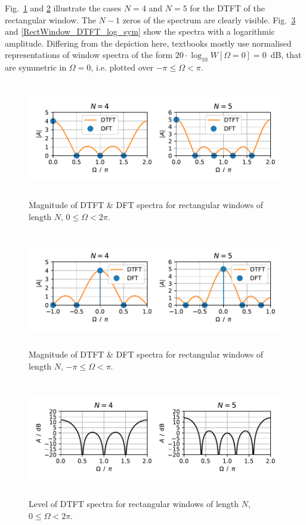 \documentclass[11pt,a4paper,DIV=12]{scrartcl}
\begin{document}
Fig.~\ref{RectWindow_DTFT_DFT_lin_asym} and \ref{RectWindow_DTFT_DFT_lin_sym}
illustrate the cases $N=4$ and $N=5$ for the DTFT of the rectangular window.
%
The $N-1$ zeros of the spectrum are clearly visible.
%
Fig.~\ref{RectWindow_DTFT_log_asym} and \ref{RectWindow_DTFT_log_sym} show the
spectra with a logarithmic amplitude.
%
Differing from the depiction here, textbooks mostly use normalised representations
of window spectra of the form $20\cdot\log_{10}W[\Omega=0]=0$~dB, that are
symmetric in $\Omega=0$, i.e. plotted over $-\pi\leq\Omega<\pi$.
%
\begin{figure}
		\centering
		\includegraphics[width=6in, height=2in]{graphics/RectWindow_DTFT_DFT_lin_asym.pdf}
		\caption{Magnitude of DTFT \& DFT spectra for rectangular windows of length
		$N$, $0\leq\Omega<2\pi$.}
		\label{RectWindow_DTFT_DFT_lin_asym}
\end{figure}
\begin{figure}
		\centering
		\includegraphics[width=6in, height=2in]{graphics/RectWindow_DTFT_DFT_lin_sym.pdf}
		\caption{Magnitude of DTFT \& DFT spectra for rectangular windows of length
		$N$, $-\pi\leq\Omega<\pi$.}
		\label{RectWindow_DTFT_DFT_lin_sym}
\end{figure}
\begin{figure}
		\centering
		\includegraphics[width=6in, height=2in]{graphics/RectWindow_DTFT_DFT_log_asym.pdf}
		\caption{Level of DTFT spectra for rectangular windows of length $N$,
		$0\leq\Omega<2\pi$.}
		\label{RectWindow_DTFT_log_asym}
\end{figure}
\end{document}

